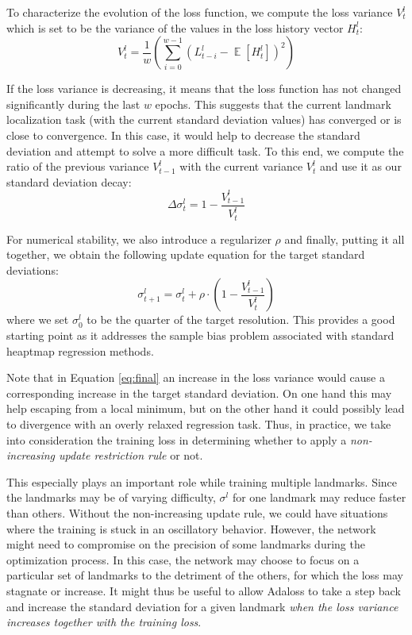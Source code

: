 \documentclass[10pt,twocolumn,letterpaper]{article}
\begin{document}
To characterize the evolution of the loss function, we compute the
loss variance $V^l_t$ which is set to be the variance of the values in
the loss history vector $H^l_t$:
\begin{equation}
V^l_t = \frac{1}{w}\left(\sum_{i=0}^{w-1} (L_{t-i}^l - \mathop{{}\mathbb{E}}[H^l_t])^2\right)
\end{equation}

If the loss variance is decreasing, it means that the loss function has not changed significantly during the last $w$ epochs. This suggests that the current landmark localization task (with the current standard deviation values) has converged or is close to convergence. In this case, it would help to decrease the standard deviation and attempt to solve a more difficult task. To this end, we compute the ratio of the previous variance $V^l_{t-1}$ with the current variance $V^l_{t}$ and use it as our standard deviation decay:
\begin{equation}
\Delta\sigma^l_{t} = 1 - \frac{V^l_{t-1}}{V^l_t}
\end{equation}

For numerical stability, we also introduce a regularizer $\rho$ and finally, putting it all together, we obtain the following update equation for the target standard deviations:
\begin{equation}
\sigma^l_{t+1} = \sigma^l_{t} + \rho \cdot \left(1 - \frac{V^l_{t-1}}{V^l_t}\right)
\label{eq:final}
\end{equation}
where we set $\sigma^l_{0}$ to be the quarter of the target resolution. This provides a good starting point as it addresses the sample bias problem
associated with standard heaptmap regression methods.



Note that in Equation \ref{eq:final} an increase in the loss variance would cause a corresponding increase in the target standard deviation. On one hand this may help escaping from a local minimum, but on the other hand it could possibly lead to divergence with an overly relaxed regression task. Thus, in practice, we take into consideration the training loss in determining whether to apply a \textit{non-increasing update restriction rule} or not. 

This especially plays an important role while training multiple landmarks. Since the landmarks may be of varying difficulty, $\sigma^l$ for one landmark may reduce faster than others. Without the non-increasing update rule, we could have situations where the training is stuck in an oscillatory behavior. However, the network might need to compromise on the precision of some landmarks during the optimization process. In this case, the network may choose to focus on a particular set of landmarks to the detriment of the others, for which the loss may stagnate or increase. It might thus be useful to allow Adaloss to take a step back and increase the standard deviation for a given landmark \textit{when the loss variance increases together with the training loss}. 
\end{document}
